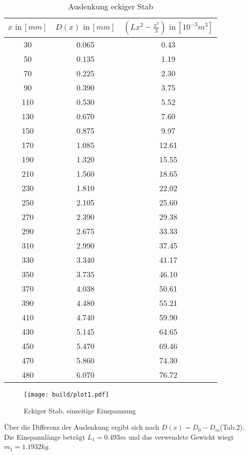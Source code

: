\begin{table}[h]
  \centering
  \label{tab:3}
  \begin{tabular}{ c c c }
    \toprule
    $x \,\, \text{in} \, [mm]$
   &{$D(x) \,\, \text{in} \, [mm]$}
   &{$(Lx^2- \frac{x^3}{3}) \,\, \text{in} \, [10^{-3}m^3]$} \\

    \midrule
    30  & 0.065& 0.43\\
    50  & 0.135& 1.19\\
    70  & 0.225& 2.30\\
    90  & 0.390& 3.75\\
    110 & 0.530& 5.52\\
    130 & 0.670& 7.60\\
    150 & 0.875& 9.97\\
    170 & 1.085&12.61\\
    190 & 1.320&15.55\\
    210 & 1.560&18.65\\
    230 & 1.810&22.02\\
    250 & 2.105&25.60\\
    270 & 2.390&29.38\\
    290 & 2.675&33.33\\
    310 & 2.990&37.45\\
    330 & 3.340&41.17\\
    350 & 3.735&46.10\\
    370 & 4.038&50.61\\
    390 & 4.480&55.21\\
    410 & 4.740&59.90\\
    430 & 5.145&64.65\\
    450 & 5.470&69.46\\
    470 & 5.860&74.30\\
    480 & 6.070&76.72\\
    \bottomrule
  \end{tabular}
  \caption{Auslenkung eckiger Stab}
\end{table}

\begin{figure}[h]
  \centering
  \texttt{[image: build/plot1.pdf]}
  \caption{Eckiger Stab, einseitige Einspannung}
  \label{fig:plot1}
\end{figure}

Über die Differenz der Auslenkung  ergibt sich nach
$D(x) = D_0 - D_m$(Tab.2). Die Einspannlänge beträgt $L_1 = 0.493m$ und
das verwendete Gewicht wiegt $m_1 = 1.1932 kg$.





